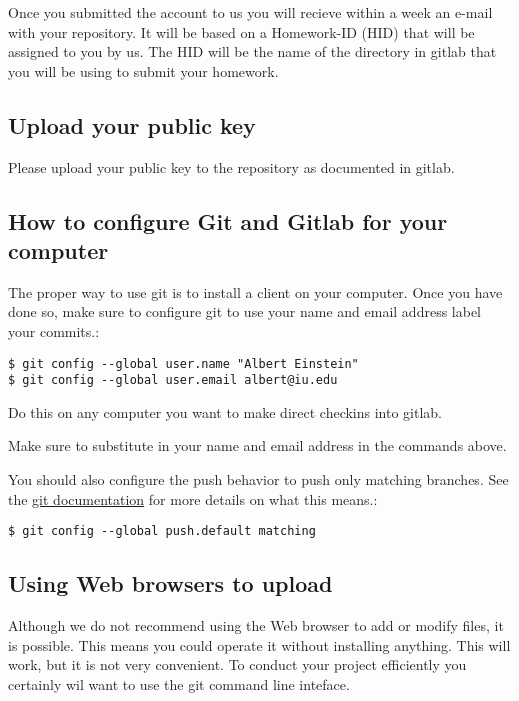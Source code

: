 Once you submitted the account to us you will recieve within a week an
e-mail with your repository. It will be based on a Homework-ID (HID)
that will be assigned to you by us. The HID will be the name of the
directory in gitlab that you will be using to submit your homework.

\subsection{Upload your public key}\label{upload-your-public-key}

Please upload your public key to the repository as documented in gitlab.

\subsection{How to configure Git and Gitlab for your
computer}\label{how-to-configure-git-and-gitlab-for-your-computer}

The proper way to use git is to install a client on your computer. Once
you have done so, make sure to configure git to use your name and email
address label your commits.:

\begin{verbatim}
$ git config --global user.name "Albert Einstein"
$ git config --global user.email albert@iu.edu
\end{verbatim}

Do this on any computer you want to make direct checkins into gitlab.

Make sure to substitute in your name and email address in the commands
above.

You should also configure the push behavior to push only matching
branches. See the \href{https://git-scm.com/docs/git-config}{git
documentation} for more details on what this means.:

\begin{verbatim}
$ git config --global push.default matching
\end{verbatim}

\subsection{Using Web browsers to
upload}\label{using-web-browsers-to-upload}

Although we do not recommend using the Web browser to add or modify
files, it is possible. This means you could operate it without
installing anything. This will work, but it is not very convenient. To
conduct your project efficiently you certainly wil want to use the git
command line inteface.

